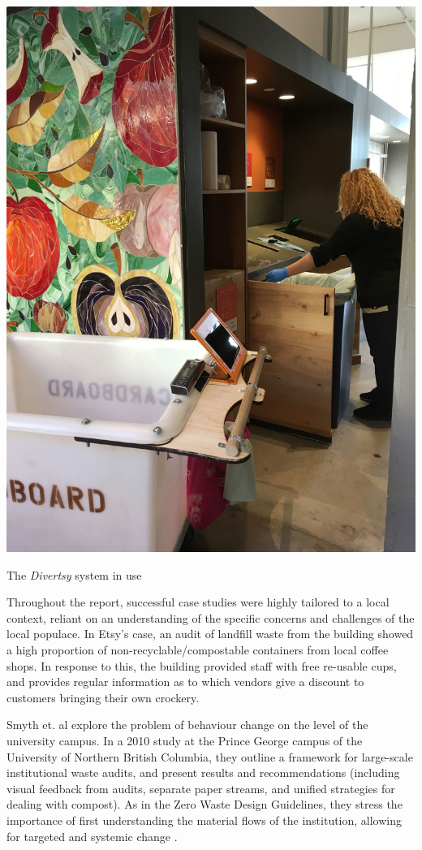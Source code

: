\documentclass[nofonts,nols,justified,nobib]{tufte-book}
\begin{document}
\begin{marginfigure}
\includegraphics[width=\textwidth]{img/1/divertsy-inuse.jpg}
\caption{The \emph{Divertsy} system in use \cite{benninger_divertsy_2019}}
\end{marginfigure}


Throughout the report, successful case studies were highly tailored to a local context, reliant on an understanding of the specific concerns and challenges of the local populace. In Etsy's case, an audit of landfill waste from the building showed a high proportion of non-recyclable/compostable containers from local coffee shops. In response to this, the building provided staff with free re-usable cups, and provides regular information as to which vendors give a discount to customers bringing their own crockery.

Smyth et. al explore the problem of behaviour change on the level of the university campus. In a 2010 study at the Prince George campus of the University of Northern British Columbia, they outline a framework for large-scale institutional waste audits, and present results and recommendations (including visual feedback from audits, separate paper streams, and unified strategies for dealing with compost). As in the Zero Waste Design Guidelines, they stress the importance of first understanding the material flows of the institution, allowing for targeted and systemic change \cite{smyth_reducing_2010}.
\end{document}
